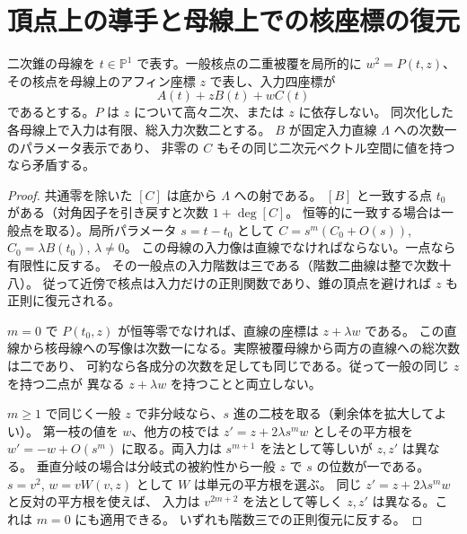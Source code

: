 \section{頂点上の導手と母線上での核座標の復元}
\label{sec:cofactor-eighteen-cone-pencil}
\begin{lemma}\label{lem:cofactor-cone-pencil-collision}
二次錐の母線を $t\in\mathbb P^1$ で表す。一般核点の二重被覆を局所的に
$w^2=P(t,z)$、その核点を母線上のアフィン座標 $z$ で表し、入力四座標が
\[
                A(t)+zB(t)+w C(t)
\]
であるとする。$P$ は $z$ について高々二次、または $z$ に依存しない。
同次化した各母線上で入力は有限、総入力次数二とする。
$B$ が固定入力直線 $\Lambda$ への次数一のパラメータ表示であり、
非零の $C$ もその同じ二次元ベクトル空間に値を持つなら矛盾する。
\end{lemma}
\begin{proof}
共通零を除いた $[C]$ は底から $\Lambda$ への射である。
$[B]$ と一致する点 $t_0$ がある（対角因子を引き戻すと次数 $1+\deg[C]$。
恒等的に一致する場合は一般点を取る）。局所パラメータ $s=t-t_0$ として
$C=s^m(C_0+O(s))$, $C_0=\lambda B(t_0)$, $\lambda\ne0$。
この母線の入力像は直線でなければならない。一点なら有限性に反する。
その一般点の入力階数は三である（階数二曲線は整で次数十八）。
従って近傍で核点は入力だけの正則関数であり、錐の頂点を避ければ $z$ も正則に復元される。

$m=0$ で $P(t_0,z)$ が恒等零でなければ、直線の座標は $z+\lambda w$ である。
この直線から核母線への写像は次数一になる。実際被覆母線から両方の直線への総次数は二であり、
可約なら各成分の次数を足しても同じである。従って一般の同じ $z$ を持つ二点が
異なる $z+\lambda w$ を持つことと両立しない。

$m\ge1$ で同じく一般 $z$ で非分岐なら、$s$ 進の二枝を取る（剰余体を拡大してよい）。
第一枝の値を $w$、他方の枝では $z'=z+2\lambda s^m w$ としその平方根を
$w'=-w+O(s^m)$ に取る。両入力は $s^{m+1}$ を法として等しいが $z,z'$ は異なる。
垂直分岐の場合は分岐式の被約性から一般 $z$ で $s$ の位数が一である。
$s=v^2$, $w=v W(v,z)$ として $W$ は単元の平方根を選ぶ。
同じ $z'=z+2\lambda s^m w$ と反対の平方根を使えば、
入力は $v^{2m+2}$ を法として等しく $z,z'$ は異なる。これは $m=0$ にも適用できる。
いずれも階数三での正則復元に反する。
\end{proof}

